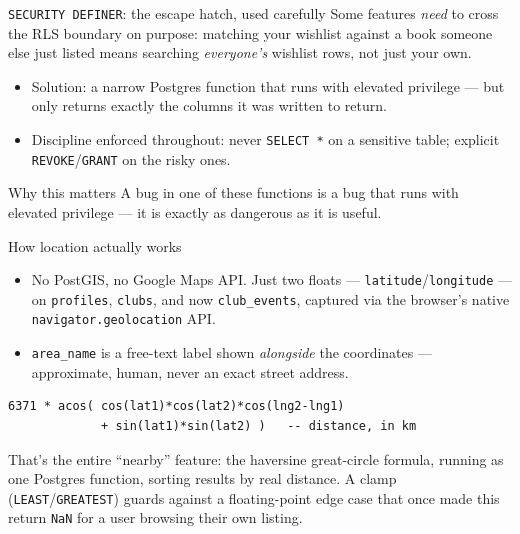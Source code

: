 \documentclass[aspectratio=169,11pt]{beamer}
\newcommand{\code}[1]{\textcolor{olkTealDark}{\texttt{#1}}}
\begin{document}
\begin{frame}[fragile]{\code{SECURITY DEFINER}: the escape hatch, used carefully}
  Some features \emph{need} to cross the RLS boundary on purpose: matching your wishlist against a book someone else just listed means searching \emph{everyone's} wishlist rows, not just your own.
  \begin{itemize}
    \item Solution: a narrow Postgres function that runs with elevated privilege --- but only returns exactly the columns it was written to return.
    \item Discipline enforced throughout: never \code{SELECT *} on a sensitive table; explicit \code{REVOKE}/\code{GRANT} on the risky ones.
  \end{itemize}
  \vfill
  \begin{alertblock}{Why this matters}
    A bug in one of these functions is a bug that runs with elevated privilege --- it is exactly as dangerous as it is useful.
  \end{alertblock}
\end{frame}

\begin{frame}[fragile]{How location actually works}
  \begin{itemize}
    \item No PostGIS, no Google Maps API. Just two floats --- \code{latitude}/\code{longitude} --- on \code{profiles}, \code{clubs}, and now \code{club\_events}, captured via the browser's native \code{navigator.geolocation} API.
    \item \code{area\_name} is a free-text label shown \emph{alongside} the coordinates --- approximate, human, never an exact street address.
  \end{itemize}
  \begin{lstlisting}
6371 * acos( cos(lat1)*cos(lat2)*cos(lng2-lng1)
             + sin(lat1)*sin(lat2) )   -- distance, in km
  \end{lstlisting}
  \small That's the entire ``nearby'' feature: the haversine great-circle formula, running as one Postgres function, sorting results by real distance. A clamp (\code{LEAST}/\code{GREATEST}) guards against a floating-point edge case that once made this return \code{NaN} for a user browsing their own listing.
\end{frame}
\end{document}
